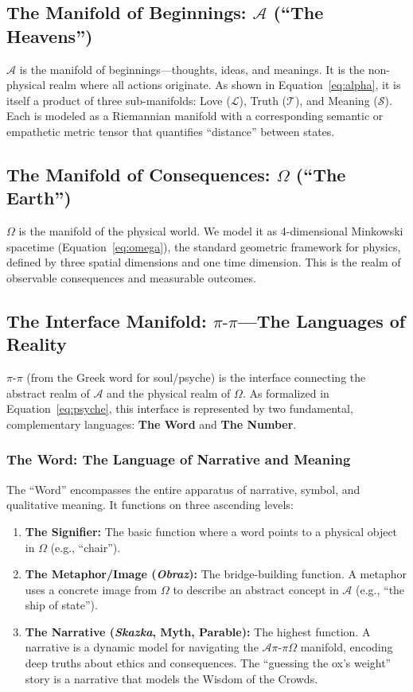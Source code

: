 \documentclass[11pt,a4paper]{article}
\begin{document}
\begin{small}
\subsection{The Manifold of Beginnings: \texorpdfstring{$\mathcal{A}$}{Alpha} (``The Heavens'')}
$\mathcal{A}$ is the manifold of beginnings—thoughts, ideas, and meanings. It is the non-physical realm where all actions originate. As shown in Equation~\eqref{eq:alpha}, it is itself a product of three sub-manifolds: Love ($\mathcal{L}$), Truth ($\mathcal{T}$), and Meaning ($\mathcal{S}$). Each is modeled as a Riemannian manifold with a corresponding semantic or empathetic metric tensor that quantifies ``distance'' between states.

\subsection{The Manifold of Consequences: \texorpdfstring{$\Omega$}{Omega} (``The Earth'')}
$\Omega$ is the manifold of the physical world. We model it as 4-dimensional Minkowski spacetime (Equation~\eqref{eq:omega}), the standard geometric framework for physics, defined by three spatial dimensions and one time dimension. This is the realm of observable consequences and measurable outcomes.

\subsection{The Interface Manifold: \texorpdfstring{$\pi\text{-}\pi$}{Psyche}—The Languages of Reality}
$\pi\text{-}\pi$ (from the Greek word for soul/psyche) is the interface connecting the abstract realm of $\mathcal{A}$ and the physical realm of $\Omega$. As formalized in Equation~\eqref{eq:psyche}, this interface is represented by two fundamental, complementary languages: \textbf{The Word} and \textbf{The Number}.

\subsubsection{The Word: The Language of Narrative and Meaning}
The ``Word'' encompasses the entire apparatus of narrative, symbol, and qualitative meaning. It functions on three ascending levels:

\begin{enumerate}
    \item \textbf{The Signifier:} The basic function where a word points to a physical object in $\Omega$ (e.g., ``chair'').
    \item \textbf{The Metaphor/Image (\textit{Obraz}):} The bridge-building function. A metaphor uses a concrete image from $\Omega$ to describe an abstract concept in $\mathcal{A}$ (e.g., ``the ship of state'').
    \item \textbf{The Narrative (\textit{Skazka}, Myth, Parable):} The highest function. A narrative is a dynamic model for navigating the $\mathcal{A}\pi\text{-}\pi\Omega$ manifold, encoding deep truths about ethics and consequences. The ``guessing the ox's weight'' story is a narrative that models the Wisdom of the Crowds.
\end{enumerate}


\end{small}
\end{document}
